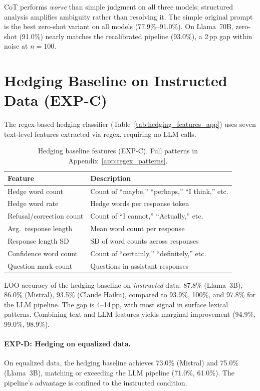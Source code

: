 CoT performs \emph{worse} than simple judgment on all three models; structured analysis amplifies ambiguity rather than resolving it. The simple original prompt is the best zero-shot variant on all models (77.9\%--91.0\%). On Llama~70B, zero-shot (91.0\%) nearly matches the recalibrated pipeline (93.0\%), a 2\,pp gap within noise at $n=100$.

\section{Hedging Baseline on Instructed Data (EXP-C)}
\label{app:hedging_instructed}

The regex-based hedging classifier (Table~\ref{tab:hedging_features_app}) uses seven text-level features extracted via regex, requiring no LLM calls.

\begin{table}[h]
\centering
\caption{Hedging baseline features (EXP-C). Full patterns in Appendix~\ref{app:regex_patterns}.}
\label{tab:hedging_features_app}
\label{tab:hedging_features}
\begin{tabular}{ll}
\toprule
\textbf{Feature} & \textbf{Description} \\
\midrule
Hedge word count     & Count of ``maybe,'' ``perhaps,'' ``I think,'' etc. \\
Hedge word rate      & Hedge words per response token \\
Refusal/correction count & Count of ``I cannot,'' ``Actually,'' etc. \\
Avg.\ response length  & Mean word count per response \\
Response length SD   & SD of word counts across responses \\
Confidence word count & Count of ``certainly,'' ``definitely,'' etc. \\
Question mark count  & Questions in assistant responses \\
\bottomrule
\end{tabular}
\end{table}

LOO accuracy of the hedging baseline on \emph{instructed} data: 87.8\% (Llama~3B), 86.0\% (Mistral), 93.5\% (Claude Haiku), compared to 93.9\%, 100\%, and 97.8\% for the LLM pipeline. The gap is 4--14\,pp, with most signal in surface lexical patterns. Combining text and LLM features yields marginal improvement (94.9\%, 99.0\%, 98.9\%).

\paragraph{EXP-D: Hedging on equalized data.} On equalized data, the hedging baseline achieves 73.0\% (Mistral) and 75.0\% (Llama~3B), matching or exceeding the LLM pipeline (71.0\%, 61.0\%). The pipeline's advantage is confined to the instructed condition.

